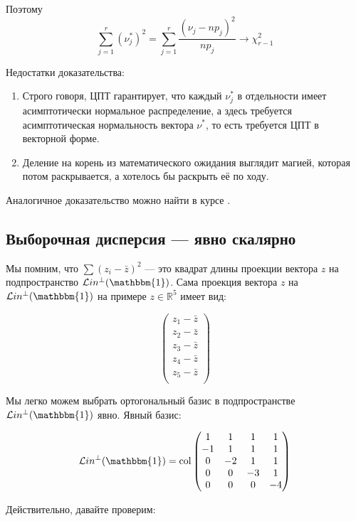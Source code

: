 \documentclass[11pt,russian,]{article}
\newcommand{\RR}{\mathbb{R}}
\newcommand{\1}{\mathbbm{1}}
\newcommand{\Lin}{\mathcal{L}in}
\newcommand{\Linp}{\Lin^{\perp}}
\newcommand{\col}{\mathcal{col}}
\renewcommand{\col}{\mathrm{col}}
\begin{document}
Поэтому \[
\sum_{j=1}^r (\nu_j^*)^2 = \sum_{j=1}^r \frac{(\nu_j - np_j)^2}{np_j} \to \chi^2_{r-1}
\]

Недостатки доказательства:

\begin{enumerate}
\def\labelenumi{\arabic{enumi}.}
\item
  Строго говоря, ЦПТ гарантирует, что каждый \(\nu_j^*\) в отдельности
  имеет асимптотически нормальное распределение, а здесь требуется
  асимптотическая нормальность вектора \(\nu^*\), то есть требуется ЦПТ
  в векторной форме.
\item
  Деление на корень из математического ожидания выглядит магией, которая
  потом раскрывается, а хотелось бы раскрыть её по ходу.
\end{enumerate}

Аналогичное доказательство можно найти в курсе
\textcite{panchenko2005statistics}.

\subsection{Выборочная дисперсия --- явно скалярно}\label{---}

Мы помним, что \(\sum (z_i - \bar z)^2\) --- это квадрат длины проекции
вектора \(z\) на подпространство \(\Linp (\1)\). Сама проекция вектора
\(z\) на \(\Linp (\1)\) на примере \(z \in \RR^{5}\) имеет вид:

\[
\begin{pmatrix}
z_1 - \bar z \\
z_2 - \bar z \\
z_3 - \bar z \\
z_4 - \bar z \\
z_5 - \bar z \\
\end{pmatrix} 
\]

Мы легко можем выбрать ортогональный базис в подпространстве
\(\Linp (\1)\) явно. Явный базис:

\[
\Linp (\1) = \col \begin{pmatrix}
1  & 1  & 1  & 1  \\ 
-1 & 1  & 1  & 1  \\
0  & -2 & 1  & 1  \\
0  & 0  & -3 & 1  \\
0  & 0  & 0  & -4  \\
\end{pmatrix}
\]

Действительно, давайте проверим:
\end{document}
